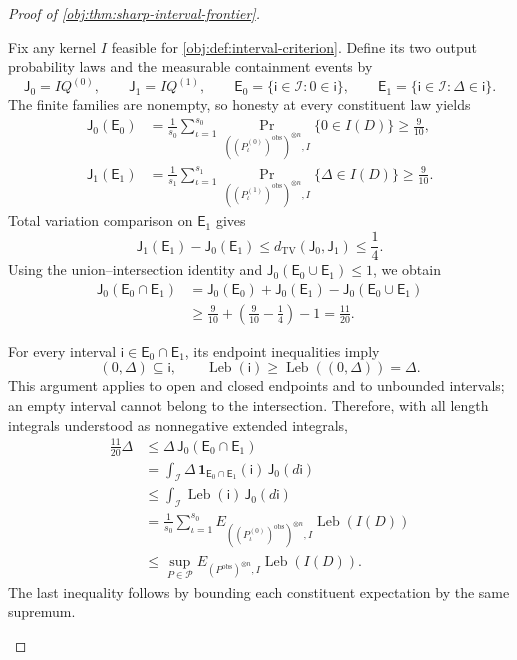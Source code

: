 \begin{proof}[Proof of \cref{obj:thm:sharp-interval-frontier}]
\begin{enumerate}
Fix any kernel \(I\) feasible for \cref{obj:def:interval-criterion}. Define its two output probability laws and the measurable containment events by
\[
\mathsf J_0=IQ^{(0)},
\qquad
\mathsf J_1=IQ^{(1)},
\qquad
\mathsf E_0=\{\mathsf i\in\mathcal I:0\in\mathsf i\},
\qquad
\mathsf E_1=\{\mathsf i\in\mathcal I:\Delta\in\mathsf i\}.
\]
The finite families are nonempty, so honesty at every constituent law yields
\[
\begin{aligned}
\mathsf J_0(\mathsf E_0)
&=
\frac1{s_0}\sum_{\iota=1}^{s_0}
\Pr_{((P^{(0)}_\iota)^{\mathrm{obs}})^{\otimes n},I}
\{0\in I(D)\}
\ge\frac9{10},\\
\mathsf J_1(\mathsf E_1)
&=
\frac1{s_1}\sum_{\iota=1}^{s_1}
\Pr_{((P^{(1)}_\iota)^{\mathrm{obs}})^{\otimes n},I}
\{\Delta\in I(D)\}
\ge\frac9{10}.
\end{aligned}
\]
Total variation comparison on \(\mathsf E_1\) gives
\[
\mathsf J_1(\mathsf E_1)-\mathsf J_0(\mathsf E_1)
\le d_{\mathrm{TV}}(\mathsf J_0,\mathsf J_1)
\le\frac14.
\]
Using the union--intersection identity and
\(\mathsf J_0(\mathsf E_0\cup\mathsf E_1)\le1\), we obtain
\[
\begin{aligned}
\mathsf J_0(\mathsf E_0\cap\mathsf E_1)
&=
\mathsf J_0(\mathsf E_0)+\mathsf J_0(\mathsf E_1)
-\mathsf J_0(\mathsf E_0\cup\mathsf E_1)\\
&\ge\frac9{10}+\left(\frac9{10}-\frac14\right)-1
=\frac{11}{20}.
\end{aligned}
\]

For every interval \(\mathsf i\in\mathsf E_0\cap\mathsf E_1\), its endpoint inequalities imply
\[
(0,\Delta)\subseteq\mathsf i,
\qquad
\operatorname{Leb}(\mathsf i)
\ge\operatorname{Leb}((0,\Delta))=\Delta.
\]
This argument applies to open and closed endpoints and to unbounded intervals; an empty interval cannot belong to the intersection. Therefore, with all length integrals understood as nonnegative extended integrals,
\[
\begin{aligned}
\frac{11}{20}\Delta
&\le\Delta\,\mathsf J_0(\mathsf E_0\cap\mathsf E_1)\\
&=
\int_{\mathcal I}
\Delta\,\mathbf 1_{\mathsf E_0\cap\mathsf E_1}(\mathsf i)
\,\mathsf J_0(d\mathsf i)\\
&\le
\int_{\mathcal I}\operatorname{Leb}(\mathsf i)\,
\mathsf J_0(d\mathsf i)\\
&=
\frac1{s_0}\sum_{\iota=1}^{s_0}
E_{((P^{(0)}_\iota)^{\mathrm{obs}})^{\otimes n},I}
\operatorname{Leb}(I(D))\\
&\le
\sup_{P\in\mathcal P}
E_{(P^{\mathrm{obs}})^{\otimes n},I}
\operatorname{Leb}(I(D)).
\end{aligned}
\]
The last inequality follows by bounding each constituent expectation by the same supremum.


\end{enumerate}
\end{proof}
